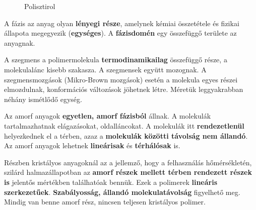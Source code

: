 \documentclass[12pt,a4paper]{article}       %
\begin{document}
\begin{tcbitemize}
  \begin{figure}[H]
    \centering
    \caption{Polisztirol}
  \end{figure}



  \tcbitem[title={\# \thetcbrasternum{} –
        Mi a fázis (anyagtudomány)?
      }]
  A fázis az anyag olyan \textbf{lényegi része}, amelynek kémiai összetétele és
  fizikai állapota megegyezik (\textbf{egységes}). A \textbf{fázisdomén} egy
  összefüggő területe az anyagnak.



  \tcbitem[title={\# \thetcbrasternum{} –
        Mit jelent polimerek esetében a szegmens?
      }]
  A szegmens a polimermolekula \textbf{termodinamikailag} összefüggő része, a
  molekulalánc kisebb szakasza. A szegmensek együtt mozognak. A
  szegmensmozgások (Mikro-Brown mozgások) esetén a molekula egyes részei
  elmozdulnak, konformációs változások jöhetnek létre. Méretük leggyakrabban
  néhány ismétlődő egység.



  \tcbitem[title={\# \thetcbrasternum{} –
        Mit jelent az, hogy egy polimer amorf?
      }]
  Az amorf anyagok \textbf{egyetlen, amorf fázisból} állnak. A molekulák
  tartalmazhatnak elágazásokat, oldalláncokat. A molekulák itt
  \textbf{rendezetlenül} helyezkednek el a térben, azaz a \textbf{molekulák
    közötti távolság nem állandó}. Az amorf anyagok lehetnek
  \textbf{lineárisak} és \textbf{térhálósak} is.



  \tcbitem[title={\# \thetcbrasternum{} –
        Mit jelent az, hogy egy polimer részben kristályos?
      }]
  Részben kristályos anyagoknál az a jellemző, hogy a felhasználás
  hőmérsékletén, szilárd halmazállapotban az \textbf{amorf részek mellett
    térben rendezett részek is} jelentős mértékben találhatóak bennük. Ezek a
  polimerek \textbf{lineáris szerkezetűek}. \textbf{Szabályosság, állandó
    molekulatávolság} figyelhető meg. Mindig van benne amorf rész, nincsen
  teljesen kristályos polimer.




\end{tcbitemize}
\end{document}
